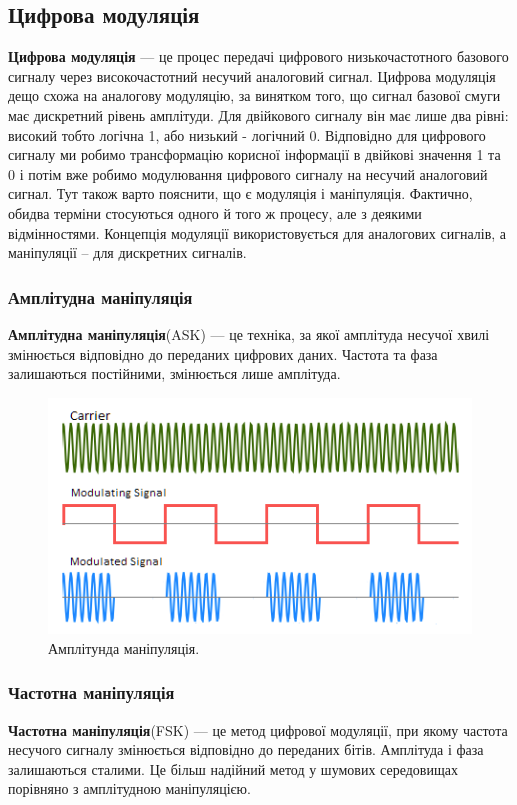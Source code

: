\documentclass{article}
\begin{document}
\newpage
\subsection{Цифрова модуляція}
\textbf{Цифрова модуляція} --- це процес передачі цифрового низькочастотного базового сигналу через високочастотний несучий аналоговий сигнал. Цифрова модуляція дещо схожа на аналогову модуляцію, за винятком того, що сигнал базової смуги має дискретний рівень амплітуди. Для двійкового сигналу він має лише два рівні: високий тобто логічна 1, або низький - логічний 0. Відповідно для цифрового сигналу ми робимо трансформацію корисної інформації в двійкові значення 1 та 0 і потім вже робимо модулювання цифрового сигналу на несучий аналоговий сигнал. Тут також варто пояснити, що є модуляція і маніпуляція. Фактично, обидва терміни стосуються одного й того ж процесу, але з деякими відмінностями. Концепція модуляції використовується для аналогових сигналів, а маніпуляції – для дискретних сигналів.

\subsubsection{Амплітудна маніпуляція}
\textbf{Амплітудна маніпуляція}(ASK) --- це техніка, за якої амплітуда несучої хвилі змінюється відповідно до переданих цифрових даних. Частота та фаза залишаються постійними, змінюється лише амплітуда. 

\begin{figure}[h!]
	\centering
	\includegraphics[width=0.6\linewidth]{images/ask.png}
	\caption{\label{fig:ask}Амплітунда маніпуляція.}
\end{figure}


\subsubsection{Частотна маніпуляція}
\textbf{Частотна маніпуляція}(FSK) --- це метод цифрової модуляції, при якому частота несучого сигналу змінюється відповідно до переданих бітів. Амплітуда і фаза залишаються сталими. Це більш надійний метод у шумових середовищах порівняно з амплітудною маніпуляцією.
\end{document}
